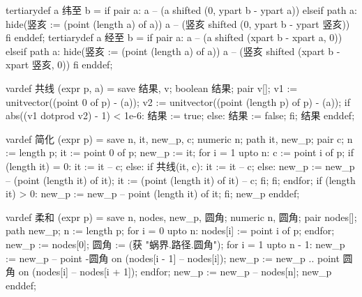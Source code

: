 tertiarydef a 纬至 b = 
  if pair a:
    a -- (a shifted (0, ypart b - ypart a))
  elseif path a:
    hide(竖亥 := (point (length a) of a))
    a -- (竖亥 shifted (0, ypart b - ypart 竖亥))
  fi
enddef;
tertiarydef a 经至 b = 
  if pair a:
    a -- (a shifted (xpart b - xpart a, 0))
  elseif path a:
    hide(竖亥 := (point (length a) of a))
    a -- (竖亥 shifted (xpart b - xpart 竖亥, 0))
  fi
enddef;
\stopMPinclusions

\startMPinclusions[+]
vardef 共线 (expr p, a) =
  save 结果, v; boolean 结果; pair v[];
  v1 := unitvector((point 0 of p) - (a));
  v2 := unitvector((point (length p) of p) - (a));
  if abs((v1 dotprod v2) - 1) < 1e-6:
     结果 := true;
  else:
    结果 := false;
  fi;
  结果
enddef;

vardef 简化 (expr p) =
  save n, it, new_p, c;
  numeric n; path it, new_p; pair c;
  n := length p;
  it := point 0 of p;
  new_p := it;
  for i = 1 upto n:
    c := point i of p;
    if (length it) = 0: 
      it := it -- c;
    else:
      if 共线(it, c):
        it := it -- c;
      else:
        new_p := new_p -- (point (length it) of it);
        it := (point (length it) of it) -- c;
      fi;
    fi;
  endfor;
  if (length it) > 0:
    new_p := new_p -- point (length it) of it;
  fi;
  new_p
enddef;

vardef 柔和 (expr p) =
  save n, nodes, new_p, 圆角; 
  numeric n, 圆角; pair nodes[]; path new_p;
  n := length p;
  for i = 0 upto n:
    nodes[i] := point i of p;
  endfor;
  new_p := nodes[0];
  圆角 := (获 "蜗界.路径.圆角");
  for i = 1 upto n - 1:
    new_p := new_p -- point -圆角 on (nodes[i - 1] -- nodes[i]);
    new_p := new_p .. point 圆角 on (nodes[i] -- nodes[i + 1]);
  endfor;
  new_p := new_p -- nodes[n];
  new_p
enddef;
\stopMPinclusions

